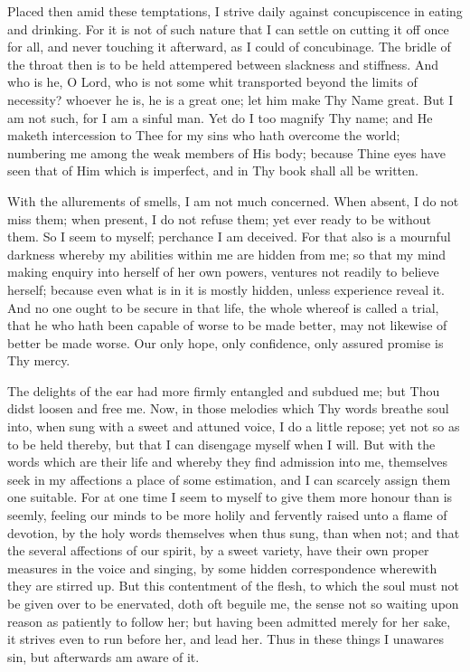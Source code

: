 \documentclass[b5paper,openright,12pt,twoside]{book}
\begin{document}
Placed then amid these temptations, I strive daily against concupiscence
in eating and drinking. For it is not of such nature that I can settle
on cutting it off once for all, and never touching it afterward, as
I could of concubinage. The bridle of the throat then is to be held
attempered between slackness and stiffness. And who is he, O Lord, who
is not some whit transported beyond the limits of necessity? whoever he
is, he is a great one; let him make Thy Name great. But I am not such,
for I am a sinful man. Yet do I too magnify Thy name; and He maketh
intercession to Thee for my sins who hath overcome the world; numbering
me among the weak members of His body; because Thine eyes have seen that
of Him which is imperfect, and in Thy book shall all be written.

With the allurements of smells, I am not much concerned. When absent, I
do not miss them; when present, I do not refuse them; yet ever ready to
be without them. So I seem to myself; perchance I am deceived. For that
also is a mournful darkness whereby my abilities within me are hidden
from me; so that my mind making enquiry into herself of her own powers,
ventures not readily to believe herself; because even what is in it
is mostly hidden, unless experience reveal it. And no one ought to be
secure in that life, the whole whereof is called a trial, that he who
hath been capable of worse to be made better, may not likewise of better
be made worse. Our only hope, only confidence, only assured promise is
Thy mercy.

The delights of the ear had more firmly entangled and subdued me; but
Thou didst loosen and free me. Now, in those melodies which Thy words
breathe soul into, when sung with a sweet and attuned voice, I do
a little repose; yet not so as to be held thereby, but that I can
disengage myself when I will. But with the words which are their
life and whereby they find admission into me, themselves seek in my
affections a place of some estimation, and I can scarcely assign them
one suitable. For at one time I seem to myself to give them more honour
than is seemly, feeling our minds to be more holily and fervently raised
unto a flame of devotion, by the holy words themselves when thus sung,
than when not; and that the several affections of our spirit, by a sweet
variety, have their own proper measures in the voice and singing, by
some hidden correspondence wherewith they are stirred up. But this
contentment of the flesh, to which the soul must not be given over to be
enervated, doth oft beguile me, the sense not so waiting upon reason as
patiently to follow her; but having been admitted merely for her sake,
it strives even to run before her, and lead her. Thus in these things I
unawares sin, but afterwards am aware of it.
\end{document}

